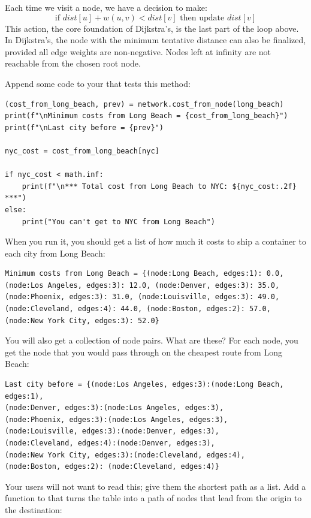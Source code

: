 Each time we visit a node, we have a decision to make:
\[
\text{if }dist[u]+w(u,v)<dist[v]\text{ then update }dist[v]
\]
This action, the core foundation of Dijkstra's, is the last part of the loop above. In Dijkstra's, the node with the minimum tentative distance can also be finalized, provided all edge weights are non-negative. Nodes left at infinity are not reachable from the chosen root node. 

Append some code to your  that tests this method:

\begin{verbatim}
(cost_from_long_beach, prev) = network.cost_from_node(long_beach)
print(f"\nMinimum costs from Long Beach = {cost_from_long_beach}")
print(f"\nLast city before = {prev}")

nyc_cost = cost_from_long_beach[nyc]

if nyc_cost < math.inf:
    print(f"\n*** Total cost from Long Beach to NYC: ${nyc_cost:.2f} ***")
else:
    print("You can't get to NYC from Long Beach")
\end{verbatim}

When you run it, you should get a list of how much it costs to ship a
container to each city from Long Beach:
\begin{verbatim}
Minimum costs from Long Beach = {(node:Long Beach, edges:1): 0.0,
(node:Los Angeles, edges:3): 12.0, (node:Denver, edges:3): 35.0,
(node:Phoenix, edges:3): 31.0, (node:Louisville, edges:3): 49.0,
(node:Cleveland, edges:4): 44.0, (node:Boston, edges:2): 57.0,
(node:New York City, edges:3): 52.0}
\end{verbatim}

You will also get a collection of node pairs. What are these? For each
node, you get the node that you would pass through on the cheapest
route from Long Beach:
\begin{verbatim}
Last city before = {(node:Los Angeles, edges:3):(node:Long Beach, edges:1),
(node:Denver, edges:3):(node:Los Angeles, edges:3),
(node:Phoenix, edges:3):(node:Los Angeles, edges:3),
(node:Louisville, edges:3):(node:Denver, edges:3),
(node:Cleveland, edges:4):(node:Denver, edges:3),
(node:New York City, edges:3):(node:Cleveland, edges:4),
(node:Boston, edges:2): (node:Cleveland, edges:4)}
\end{verbatim}

Your users will not want to read this; give them the shortest path as a list.  Add a function to
 that turns the  table into a path of
nodes that lead from the origin to the destination:

